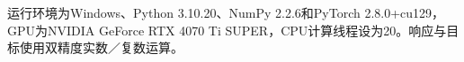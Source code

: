 运行环境为Windows、Python 3.10.20、NumPy 2.2.6和PyTorch 2.8.0+cu129，GPU为NVIDIA GeForce RTX 4070 Ti SUPER，CPU计算线程设为20。响应与目标使用双精度实数／复数运算。
